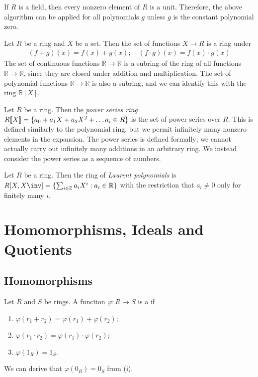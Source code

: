 \begin{remark}
	If $R$ is a field, then every nonzero element of $R$ is a unit.
	Therefore, the above algorithm can be applied for all polynomials $g$ unless $g$ is the constant polynomial zero.
\end{remark}

\begin{example}
	Let $R$ be a ring and $X$ be a set.
	Then the set of functions $X \to R$ is a ring under
	\begin{align*}
		(f + g)(x) = f(x) + g(x);\quad (f \cdot g)(x) = f(x) \cdot g(x)
	\end{align*}
	The set of continuous functions $\mathbb R \to \mathbb R$ is a subring of the ring of all functions $\mathbb R \to \mathbb R$, since they are closed under addition and multiplication.
	The set of polynomial functions $\mathbb R \to \mathbb R$ is also a subring, and we can identify this with the ring $\mathbb R[X]$.
\end{example}

\begin{example}
	Let $R$ be a ring.
	Then the \textit{power series ring} $R[\![X]\!] = \{a_0 + a_1X + a_2 X^2 + \dots a_i \in R\}$ is the set of power series over $R$.
	This is defined similarly to the polynomial ring, but we permit infinitely many nonzero elements in the expansion.
	The power series is defined formally; we cannot actually carry out infinitely many additions in an arbitrary ring.
	We instead consider the power series as a sequence of numbers.
\end{example}

\begin{example}
	Let $R$ be a ring.
	Then the ring of \textit{Laurent polynomials} is $R[X,X\inv] = \{\sum_{i \in \mathbb{Z}} a_i X^i : a_i \in \mathbb{R}\}$ with the restriction that $a_i \neq 0$ only for finitely many $i$.
\end{example}

\section{Homomorphisms, Ideals and Quotients}
\subsection{Homomorphisms}
\begin{definition}
	Let $R$ and $S$ be rings.
	A function $\varphi \colon R \to S$ is a  if
	\begin{enumerate}
		\item $\varphi(r_1 + r_2) = \varphi(r_1) + \varphi(r_2)$;
		\item $\varphi(r_1 \cdot r_2) = \varphi(r_1) \cdot \varphi(r_2)$;
		\item $\varphi(1_R) = 1_S$.
	\end{enumerate}
	We can derive that $\varphi(0_R) = 0_S$ from (i).
\end{definition}

